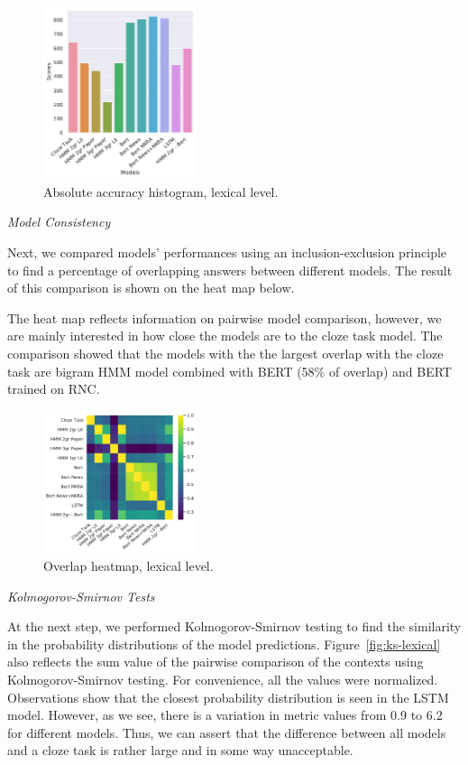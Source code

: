 \documentclass[a4paper]{article}
\newcommand{\head}[1]{\vspace{0.5em}\emph{#1}\vspace{0.25em}}
\begin{document}
\begin{figure}
\caption{Absolute accuracy histogram, lexical level.}
\label{fig:abs-accuracy-hist-lex}
\centering
\includegraphics[width=0.4\textwidth]{figures/pdf/abs-accuracy-hist-lex.pdf}
\end{figure}

\head{Model Consistency}

Next, we compared models’ performances using an inclusion-exclusion principle to find a percentage of overlapping answers between different models. The result of this comparison is shown on the heat map below.

The heat map reflects information on pairwise model comparison,
however, we are mainly interested in how close the models are to the
cloze task model. The comparison showed that the models with the
the largest overlap with the cloze task are bigram HMM model combined
with BERT (58\% of overlap) and BERT trained on RNC.

\begin{figure}
\caption{Overlap heatmap, lexical level.}
\label{fig:heatmap-context-accord-lex}
\centering
\includegraphics[width=0.4\textwidth]{figures/pdf/heatmap-context-accord-lex.pdf}
\end{figure}

\head{Kolmogorov-Smirnov Tests}

At the next step, we performed Kolmogorov-Smirnov testing to find the similarity in the probability distributions of the model predictions. Figure~\ref{fig:ks-lexical} also reflects the sum value of the pairwise comparison of the contexts using Kolmogorov-Smirnov testing. For convenience, all the values were normalized. Observations show that the closest probability distribution is seen in the LSTM model. However, as we see, there is a variation in metric values from 0.9 to 6.2 for different models. Thus, we can assert that the difference between all models and a cloze task is rather large and in some way unacceptable.
\end{document}
